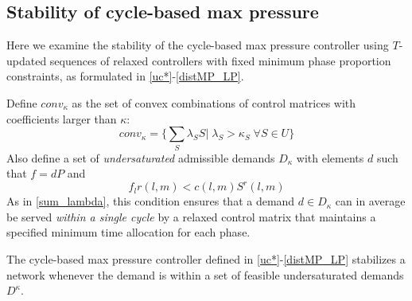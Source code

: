 \subsection*{Stability of cycle-based max pressure}
Here we examine the stability of the cycle-based max pressure controller using $T$-updated sequences of relaxed controllers with fixed minimum phase proportion constraints, as formulated in \eqref{uc*}-\eqref{distMP_LP}.

Define $conv_{\kappa}$ as the set of convex combinations of control matrices with coefficients larger than $\kappa$:
\begin{equation}
conv_{\kappa} = \Big\{ \sum_{S}\lambda_{S}S \big| \; \lambda_S > \kappa_S \; \forall S\in U\Big\}
\end{equation}
Also define a set of \emph{undersaturated} admissible demands $D_{\kappa}$ with elements $d$ such that $f=dP$ and 
\begin{equation} f_{l}r(l,m) < c(l,m)S^r(l,m) \end{equation} 
As in \eqref{sum_lambda}, this condition ensures that a demand $d\in D_{\kappa}$ can in average be served \emph{within a single cycle} by a relaxed control matrix that maintains a specified minimum time allocation for each phase. 
\begin{Thm}\label{stabRelaxMP}
The cycle-based max pressure controller defined in \eqref{uc*}-\eqref{distMP_LP} 
stabilizes a network whenever the demand is within a set of feasible undersaturated demands $D^{\kappa}$.
\end{Thm}
